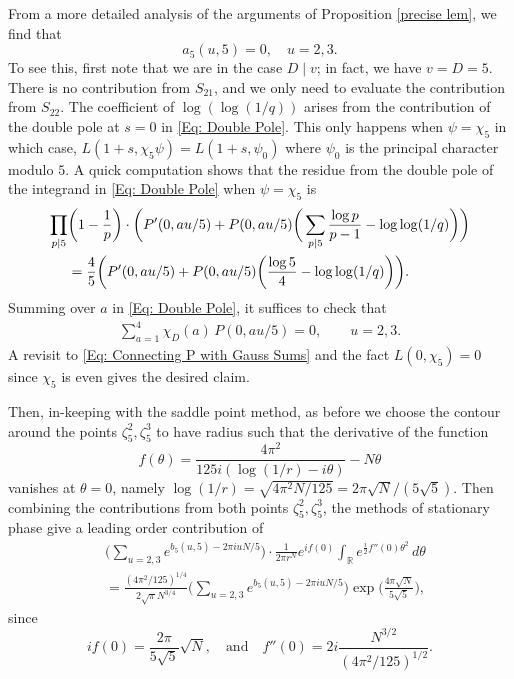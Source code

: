\documentclass[11pt]{amsart}
\numberwithin{equation}{section}
\newcommand{\mb}{\mathbb}
\theoremstyle{remark}
\begin{document}
From a more detailed analysis of the arguments of Proposition \ref{precise lem}, we find that 
\[
a_5(u,5)=0, \quad u=2,3.
\]
To see this, first note that we are in the case $D \mid v$; in fact, we have $v=D=5$. There is no contribution from $S_{21}$, and we only need to evaluate the contribution from $S_{22}$. The coefficient of $\log(\log(1/q))$ arises from the contribution of the double pole at $s=0$ in \eqref{Eq: Double Pole}. This only happens when $\psi = \chi_5$ in which case, $L(1+s,\chi_5\psi) = L(1+s,\psi_0)$ where $\psi_0$ is the principal character modulo $5$. A quick computation shows that the residue from the double pole of the integrand in \eqref{Eq: Double Pole} when $\psi = \chi_5$ is
\begin{align}\label{Eq: Residue at Double Pole}
\prod_{p \mid 5}& \bigg(1-\frac{1}{p} \bigg)  \cdot \bigg( P'(0,au/5)+P(0,au/5) \bigg( \sum_{p \mid 5} \frac{\log p}{p-1} -\log\log(1/q) \bigg) \bigg) \notag \\
&= \frac{4}{5} \bigg( P'(0,au/5)+P(0,au/5) \bigg( \frac{\log 5}{4} -\log\log(1/q) \bigg) \bigg).
\end{align}
Summing over $a$ in \eqref{Eq: Double Pole}, it suffices to check that
\begin{align}\label{Eq: Polylogarithm}
\sum_{a=1}^{4} \chi_D(a)\, P(0,au/5) = 0, \qquad u=2,3.
\end{align}
A revisit to \eqref{Eq: Connecting P with Gauss Sums} and the fact $L(0,\chi_5)=0$ since $\chi_5$ is even gives the desired claim.
\par
Then, in-keeping with the saddle point method, as before we choose the contour around the points $\zeta_5^2,\zeta_5^3$ to have radius such that the derivative of the function 
\[
f(\theta)=\frac{4\pi^2}{125 i(\log(1/r)-i\theta)}-N\theta
\] 
vanishes at $\theta=0$, namely $\log(1/r)=\sqrt{4\pi^2N/125}=2\pi\sqrt{N}/(5\sqrt{5})$. Then combining the contributions from both points $\zeta_5^2,\zeta_5^3$, the methods of stationary phase give a leading order contribution of 
\begin{align*}
&\bigg( \sum_{u=2,3} e^{b_5(u,5)-2\pi iuN/5} \bigg)\cdot \frac{1}{2\pi r^N}e^{if(0)}\int_\mb{R}e^{\tfrac{i}{2}f''(0)\theta^2} \, d\theta \\
&=
\frac{(4\pi^2/125)^{1/4}}{2\sqrt{\pi}N^{3/4}}\bigg(\sum_{u=2,3}e^{b_5(u,5)-2\pi i uN/5}\bigg)\exp\bigg(\frac{4\pi\sqrt{N}}{5\sqrt{5}}\bigg),
\end{align*}
since 
\[
if(0)=\frac{2\pi}{5\sqrt{5}}\sqrt{N},\quad \textrm{and} \quad f''(0)=2i\frac{N^{3/2}}{(4\pi^2/125)^{1/2}}.
\]
\end{document}
